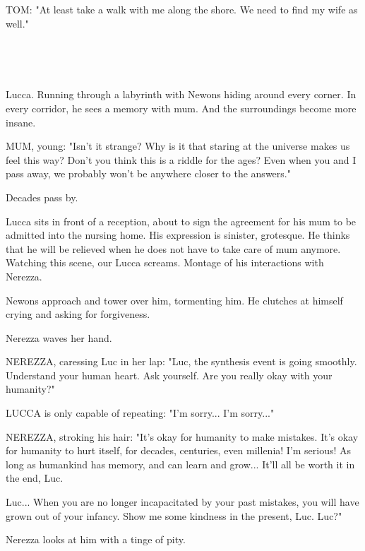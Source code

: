 \documentclass[11pt]{article}
\begin{document}
TOM: "At least take a walk with me along the shore.
We need to find my wife as well."

\ 

\ 

Lucca.
Running through a labyrinth with Newons hiding around every corner.
In every corridor, he sees a memory with mum.
And the surroundings become more insane.

MUM, young: "Isn't it strange?
Why is it that staring at the universe makes us feel this way?
Don't you think this is a riddle for the ages?
Even when you and I pass away, we probably won't be anywhere closer to the answers."

Decades pass by.

Lucca sits in front of a reception, about to sign the agreement for his mum to be admitted into the nursing home.
His expression is sinister, grotesque.
He thinks that he will be relieved when he does not have to take care of mum anymore.
Watching this scene, our Lucca screams. 
Montage of his interactions with Nerezza.

Newons approach and tower over him, tormenting him.
He clutches at himself crying and asking for forgiveness.

Nerezza waves her hand.

NEREZZA, caressing Luc in her lap: "Luc, the synthesis event is going smoothly.
Understand your human heart.
Ask yourself.
Are you really okay with your humanity?"

LUCCA is only capable of repeating: "I'm sorry... 
I'm sorry..."

NEREZZA, stroking his hair: "It's okay for humanity to make mistakes.
It's okay for humanity to hurt itself, for decades, centuries, even millenia!
I'm serious!
As long as humankind has memory, and can learn and grow...
It'll all be worth it in the end, Luc.

Luc... 
When you are no longer incapacitated by your past mistakes, you will have grown out of your infancy.
Show me some kindness in the present, Luc.
Luc?"

Nerezza looks at him with a tinge of pity.
\end{document}
